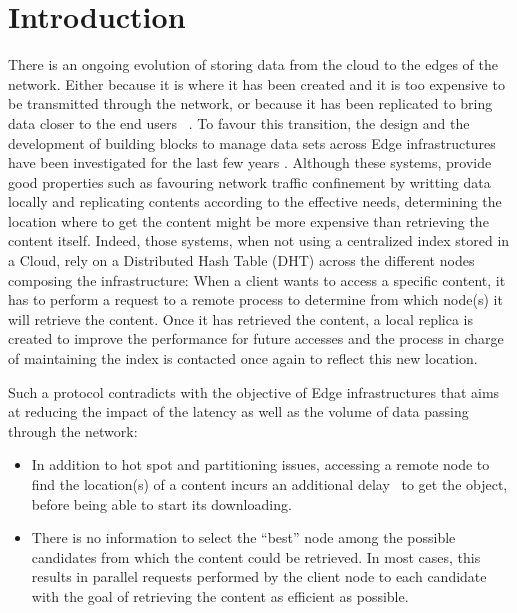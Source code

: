 
\section{Introduction}

There is an ongoing evolution of storing data from the cloud to the
edges of the network. Either because it is where it has been created
and it is too expensive to be transmitted through the network, or
because it has been replicated to bring data closer to the end users
~\cite{shi2016edge, foggy_cache, cachier}.
%
To favour this transition, the design and the development of building
blocks to manage data sets across Edge infrastructures have been
investigated for the last few years \cite{confais2017performance,
  confais2017object, fogstore, hasenburg2020towards}.  Although these
systems, provide good properties such as favouring network traffic
confinement by writting data locally and replicating contents
according to the effective needs, determining the location where to
get the content might be more expensive than retrieving the content
itself.
%
Indeed, those systems, when not using a centralized index stored in a
Cloud, rely on a Distributed Hash Table (DHT) across the different
nodes composing the infrastructure: When a client wants to access a
specific content, it has to perform a request to a remote process to
determine from which node(s) it will retrieve the content.  Once it has
retrieved the content, a local replica
is created to improve the performance for future accesses and the
process in charge of maintaining the index is contacted once again to reflect this
new location.
%


Such a protocol contradicts with the objective of Edge
infrastructures that aims at reducing the impact of the
latency as well as the volume of data passing through the network:
\begin{itemize}
  \item In addition to hot spot and partitioning issues, accessing a
    remote node to find the location(s) of a content incurs an
    additional delay~\cite{asrese2019measuring, doan2019tracing} to
    get the object, before being able to start its downloading.
  \item There is no information to select the ``best'' node among the
     possible candidates from which the content  could be
     retrieved. In most cases, this results in parallel requests performed by the client node to
     each candidate with the goal of retrieving the content as efficient
     as possible.
\end{itemize}    

